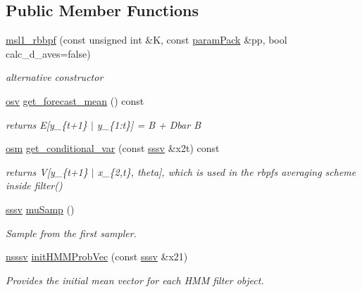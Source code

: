 \subsection*{Public Member Functions}
\begin{DoxyCompactItemize}
\item 
\hyperlink{classmsl1__rbbpf_a1b22c0d59ea9e2992c45ab7c2a7d79a3}{msl1\+\_\+rbbpf} (const unsigned int \&K, const \hyperlink{classparamPack}{param\+Pack} \&pp, bool calc\+\_\+d\+\_\+aves=false)
\begin{DoxyCompactList}\small\item\em alternative constructor \end{DoxyCompactList}\item 
\hyperlink{classmsl1__rbbpf_a23daf10ba0f0b6fead88bc83b4fa27a3}{osv} \hyperlink{classmsl1__rbbpf_af17379667c366be4faaf0241b64d00e6}{get\+\_\+forecast\+\_\+mean} () const
\begin{DoxyCompactList}\small\item\em returns E\mbox{[}y\+\_\+\{t+1\} $\vert$ y\+\_\+\{1\+:t\}\mbox{]} =  B +  Dbar B \end{DoxyCompactList}\item 
\hyperlink{classmsl1__rbbpf_a1282d71d4d1fc83fd5139ad51c549ecc}{osm} \hyperlink{classmsl1__rbbpf_ad9ae963432618014085777d34f73040d}{get\+\_\+conditional\+\_\+var} (const \hyperlink{classmsl1__rbbpf_a6703c548bb85bbe8e5a6baa723e8f0bb}{sssv} \&x2t) const
\begin{DoxyCompactList}\small\item\em returns V\mbox{[}y\+\_\+\{t+1\} $\vert$ x\+\_\+\{2,t\}, theta\mbox{]}, which is used in the rbpf\textquotesingle{}s averaging scheme inside filter() \end{DoxyCompactList}\item 
\hyperlink{classmsl1__rbbpf_a6703c548bb85bbe8e5a6baa723e8f0bb}{sssv} \hyperlink{classmsl1__rbbpf_acb7bb10daafe487b94f2158e4753c360}{mu\+Samp} ()
\begin{DoxyCompactList}\small\item\em Sample from the first sampler. \end{DoxyCompactList}\item 
\hyperlink{classmsl1__rbbpf_a7a938d1eb0d1db350b2f2f6804d58999}{nsssv} \hyperlink{classmsl1__rbbpf_a3555cc4b6c307e4e8d2300c0514ce5dd}{init\+H\+M\+M\+Prob\+Vec} (const \hyperlink{classmsl1__rbbpf_a6703c548bb85bbe8e5a6baa723e8f0bb}{sssv} \&x21)
\begin{DoxyCompactList}\small\item\em Provides the initial mean vector for each H\+MM filter object. \end{DoxyCompactList}\item 

\end{DoxyCompactItemize}

